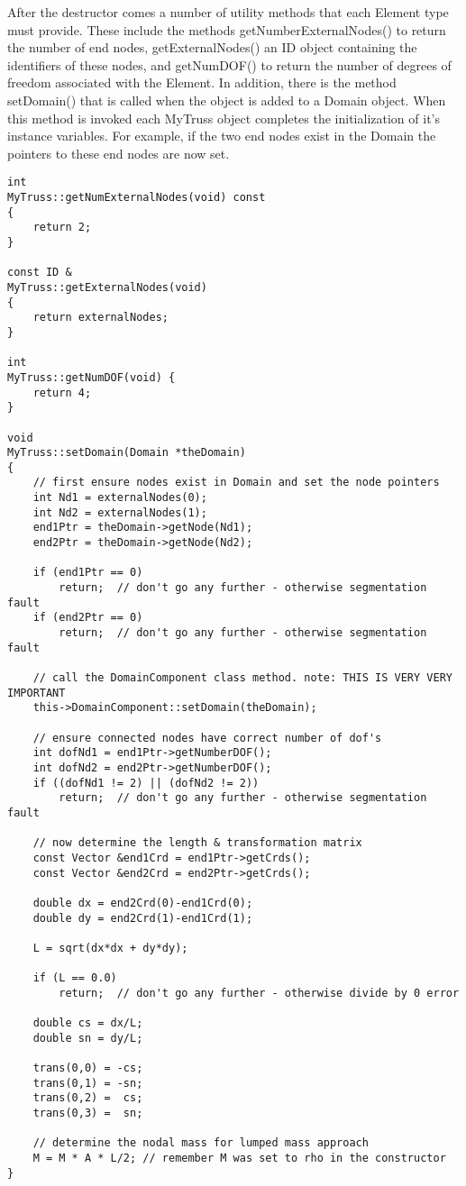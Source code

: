 \documentclass[12pt]{article}
\begin{document}
After the destructor comes a number of utility methods that each
Element type must provide. These include the  methods {\sf
getNumberExternalNodes()} to return the number of end nodes, {\sf
getExternalNodes()} an ID object containing the identifiers of these
nodes, and {\sf getNumDOF()} to return the number of degrees of freedom 
associated with the Element. In addition, there is the method {\sf
setDomain()} that is called when the object is added to a Domain
object. When this method is invoked each MyTruss object completes the
initialization of it's instance variables. For example, if the two end
nodes exist in the Domain the pointers to these end nodes are now set.

{\sf\small
\begin{verbatim}
int
MyTruss::getNumExternalNodes(void) const
{
    return 2;
}

const ID &
MyTruss::getExternalNodes(void) 
{
    return externalNodes;
}

int
MyTruss::getNumDOF(void) {
    return 4;
}

void
MyTruss::setDomain(Domain *theDomain)
{
    // first ensure nodes exist in Domain and set the node pointers
    int Nd1 = externalNodes(0);
    int Nd2 = externalNodes(1);
    end1Ptr = theDomain->getNode(Nd1);
    end2Ptr = theDomain->getNode(Nd2);	

    if (end1Ptr == 0) 
        return;  // don't go any further - otherwise segmentation fault
    if (end2Ptr == 0) 
        return;  // don't go any further - otherwise segmentation fault
    
    // call the DomainComponent class method. note: THIS IS VERY VERY IMPORTANT
    this->DomainComponent::setDomain(theDomain);

    // ensure connected nodes have correct number of dof's
    int dofNd1 = end1Ptr->getNumberDOF();
    int dofNd2 = end2Ptr->getNumberDOF();	
    if ((dofNd1 != 2) || (dofNd2 != 2)) 
        return;  // don't go any further - otherwise segmentation fault

    // now determine the length & transformation matrix
    const Vector &end1Crd = end1Ptr->getCrds();
    const Vector &end2Crd = end2Ptr->getCrds();	

    double dx = end2Crd(0)-end1Crd(0);
    double dy = end2Crd(1)-end1Crd(1);	
    
    L = sqrt(dx*dx + dy*dy);
    
    if (L == 0.0) 
        return;  // don't go any further - otherwise divide by 0 error
	
    double cs = dx/L;
    double sn = dy/L;

    trans(0,0) = -cs;
    trans(0,1) = -sn;    
    trans(0,2) =  cs;
    trans(0,3) =  sn;

    // determine the nodal mass for lumped mass approach
    M = M * A * L/2; // remember M was set to rho in the constructor
}   	 
\end{verbatim}
}
\end{document}
